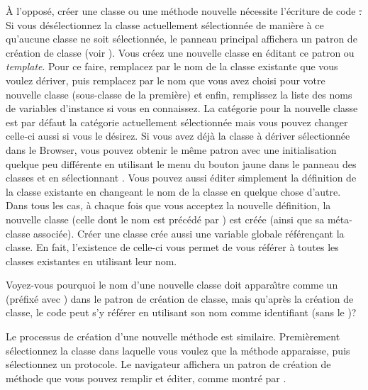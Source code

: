 \documentclass[a4paper,10pt,twoside]{book}
\begin{document}
\`A l'oppos\'e, cr\'eer une classe ou une m\'ethode nouvelle n\'ecessite 
l'\'ecriture de code \st.
Si vous d\'es\'electionnez la classe actuellement s\'electionn\'ee de mani\`ere \`a ce qu'aucune classe ne soit s\'electionn\'ee, le panneau principal 
affichera un patron de cr\'eation de classe
(voir ).
Vous cr\'eez une nouvelle classe en \'editant ce patron ou \emph{template}. Pour ce faire, remplacez  par le nom de la classe existante
que vous voulez d\'eriver, puis remplacez  par le nom
que vous avez choisi pour votre nouvelle classe (sous-classe de la premi\`ere) et enfin, remplissez la liste des noms de variables d'instance si vous en connaissez.  
La cat\'egorie pour la nouvelle classe est par d\'efaut la cat\'egorie actuellement s\'electionn\'ee mais vous pouvez changer celle-ci aussi si vous le d\'esirez.
Si vous avez d\'ej\`a la classe \`a d\'eriver s\'electionn\'ee dans 
le Browser, vous pouvez obtenir le m\^eme patron avec une initialisation
quelque peu diff\'erente en utilisant le menu du bouton jaune
dans le panneau des classes et en s\'electionnant 
 .
Vous pouvez aussi \'editer simplement la d\'efinition de la classe existante en changeant le nom de la classe en quelque chose d'autre.
Dans tous les cas, \`a chaque fois que vous acceptez la nouvelle d\'efinition, la nouvelle classe 
(celle dont le nom est pr\'ec\'ed\'e par \ct{#}) est cr\'e\'ee (ainsi que sa m\'eta-classe associ\'ee).  
Cr\'eer une classe cr\'ee aussi une variable globale r\'ef\'eren\c{c}ant
la classe. En fait, l'existence de celle-ci vous permet de vous 
r\'ef\'erer \`a toutes les classes existantes en utilisant leur nom.

Voyez-vous pourquoi le nom d'une nouvelle classe doit appara\^{\i}tre
comme un  (\ie pr\'efix\'e avec \ct{#}) dans le
patron de cr\'eation de classe, mais qu'apr\`es la cr\'eation
de classe, le code peut s'y r\'ef\'erer en utilisant
son nom comme identifiant (\ie sans le \ct{#})?

Le processus de cr\'eation d'une nouvelle m\'ethode
est similaire. Premi\`erement s\'electionnez la classe dans laquelle vous
voulez que la m\'ethode apparaisse, puis s\'electionnez un protocole.
Le navigateur affichera un patron de cr\'eation de m\'ethode que
vous pouvez remplir et \'editer, comme montr\'e par
.
\end{document}
